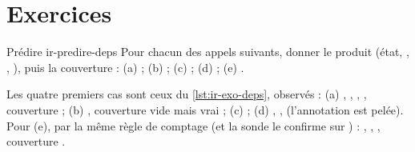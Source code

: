 \section*{Exercices}

\begin{exercice}{Prédire }{ir-predire-deps}
Pour chacun des appels suivants, donner le  produit (état, , , ), puis la couverture  : (a)  ; (b)  ; (c)  ; (d)  ; (e) .
\end{exercice}
\begin{solution}
Les quatre premiers cas sont ceux du \cref{lst:ir-exo-deps}, observés : (a) , , , , couverture \code{[a]} ; (b) , couverture vide mais  vrai ; (c)  ; (d) , \code{[a]},  (l'annotation est pelée). Pour (e), par la même règle de comptage (et la sonde le confirme sur ) : , , , couverture \code{[y]}.
\end{solution}

